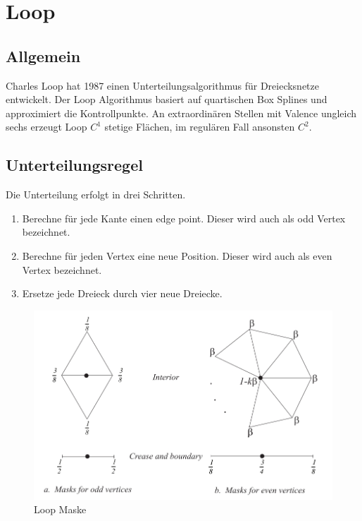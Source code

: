 \section{Loop}

\subsection{Allgemein}

Charles Loop hat 1987 einen Unterteilungsalgorithmus für Dreiecksnetze entwickelt.
Der Loop Algorithmus basiert auf quartischen Box Splines und approximiert die Kontrollpunkte.
An extraordinären Stellen mit Valence ungleich sechs erzeugt Loop \(C^1\) stetige Flächen,
im regulären Fall ansonsten \(C^2\).
\cite[S. 70f]{Zorin.subdivcourse} \cite[S. 56f]{Standford.24.07.2015}

\subsection{Unterteilungsregel}

Die Unterteilung erfolgt in drei Schritten.
\begin{enumerate}
\item Berechne für jede Kante einen edge point. Dieser wird auch als odd Vertex bezeichnet.
\item Berechne für jeden Vertex eine neue Position. Dieser wird auch als even Vertex bezeichnet.
\item Ersetze jede Dreieck durch vier neue Dreiecke.
\end{enumerate}

\begin{figure}
\centering
\includegraphics[width=1.0\textwidth]{content/media/sd_loop_mask.jpg}
\caption{Loop Maske \cite[S. 70f]{Zorin.subdivcourse}}
\label{fig:sd_loop_mask}
\end{figure}

